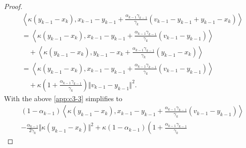 \documentclass[12pt]{article}
\begin{document}
\begin{proof}
            \begin{align*}
                & 
                \left\langle 
                    \kappa(y_{k - 1} - x_k),
                    x_{k - 1} - y_{k - 1} 
                    + 
                    \frac{\alpha_{k - 1}\gamma_{k - 1}}{\gamma_k}
                    (v_{k - 1} - y_{k - 1} + y_{k - 1} - x_k) 
                \right\rangle
                \\
                &= 
                \left\langle 
                    \kappa(y_{k - 1} - x_k), 
                    x_{k - 1} - y_{k - 1}
                    + 
                    \frac{\alpha_{k - 1}\gamma_{k - 1}}{\gamma_k}
                    (v_{k - 1} - y_{k - 1})  
                \right\rangle
                \\ 
                &\quad 
                    + 
                    \left\langle 
                        \kappa(y_{k - 1} - x_k), 
                        y_{k - 1} - x_k + 
                        \frac{\alpha_{k - 1}\gamma_{k - 1}}
                        {\gamma_k}
                        (y_{k - 1} - x_k)
                    \right\rangle
                \\
                &= 
                \left\langle 
                    \kappa(y_{k - 1} - x_k), 
                    x_{k - 1} - y_{k - 1}
                    + 
                    \frac{\alpha_{k - 1}\gamma_{k - 1}}{\gamma_k}
                    (v_{k - 1} - y_{k - 1})  
                \right\rangle
                \\ 
                &\quad 
                    + 
                    \kappa\left(
                        1 + \frac{\alpha_{k - 1}\gamma_{k - 1}}{\gamma_k}
                    \right)
                    \Vert v_{k - 1} - y_{k - 1}\Vert^2. 
            \end{align*}
            With the above \ref*{app:c3-3} simplifies to
            \begin{align*}
                &
                (1 - \alpha_{k - 1})\left\langle 
                    \kappa(y_{k - 1} - x_k), 
                    x_{k - 1} - y_{k - 1}
                    + 
                    \frac{\alpha_{k - 1}\gamma_{k - 1}}{\gamma_k}
                    (v_{k - 1} - y_{k - 1})  
                \right\rangle
                \\
                    & 
                    - \frac{\alpha_{k - 1}}{2\gamma_k}
                    \Vert \kappa(y_{k - 1} - x_k)\Vert^2
                    + 
                    \kappa(1 - \alpha_{k - 1})\left(
                        1 + \frac{\alpha_{k - 1}\gamma_{k - 1}}{\gamma_k}

\end{align*}
\end{proof}
\end{document}
